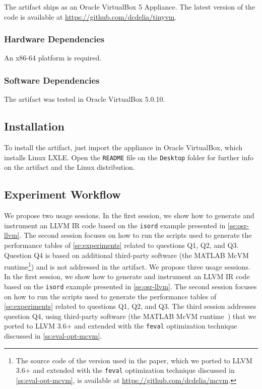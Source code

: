 The artifact ships as an Oracle VirtualBox 5 Appliance.
The latest version of the code is available at \url{https://github.com/dcdelia/tinyvm}.

\subsubsection{Hardware Dependencies}

An x86-64 platform is required.

\subsubsection{Software Dependencies}

The artifact was tested in Oracle VirtualBox 5.0.10. 


\subsection{Installation}

To install the artifact, just import the appliance in Oracle VirtualBox, which installs Linux LXLE. Open the {\tt README} file on the {\tt Desktop} folder for further info on the artifact and the Linux distribution.

\subsection{Experiment Workflow}

\ifdefined \nomcvm
We propose two usage sessions. In the first session, we show how to generate and instrument an LLVM IR code based on the \texttt{isord} example presented in \mysection\ref{se:osr-llvm}. The second session focuses on how to run the scripts used to generate the performance tables of \mysection\ref{se:experiments} related to questions Q1, Q2, and Q3. Question Q4 is based on additional third-party software (the MATLAB McVM runtime\footnote{The source code of the version used in the paper, which we ported to LLVM 3.6+ and extended with the {\tt feval} optimization technique discussed in \ref{ss:eval-opt-mcvm}, is available at \url{https://github.com/dcdelia/mcvm}.}) and is not addressed in the artifact.
\else
We propose three usage sessions. In the first session, we show how to generate and instrument an LLVM IR code based on the \texttt{isord} example presented in \mysection\ref{se:osr-llvm}. The second session focuses on how to run the scripts used to generate the performance tables of \mysection\ref{se:experiments} related to questions Q1, Q2, and Q3. The third session addresses question Q4, using third-party software (the MATLAB McVM runtime~\cite{mcvm}) that we ported to LLVM 3.6+ and extended with the {\tt feval} optimization technique discussed in \ref{ss:eval-opt-mcvm}.
\fi

